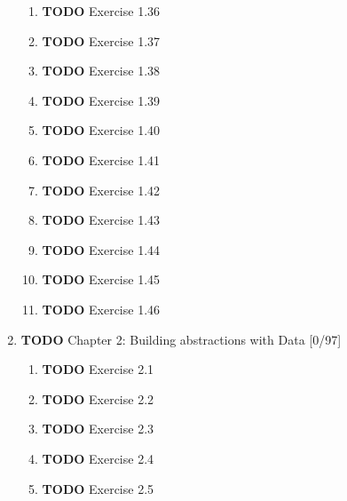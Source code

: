 \documentclass[11pt]{article}
\begin{document}
\begin{enumerate}
\begin{enumerate}
\item {\bfseries\sffamily TODO} Exercise 1.36
\label{sec:org29e807e}

\item {\bfseries\sffamily TODO} Exercise 1.37
\label{sec:org7d01ac9}

\item {\bfseries\sffamily TODO} Exercise 1.38
\label{sec:org8d2c3f0}

\item {\bfseries\sffamily TODO} Exercise 1.39
\label{sec:orgeb3da39}

\item {\bfseries\sffamily TODO} Exercise 1.40
\label{sec:orgfdf52ee}

\item {\bfseries\sffamily TODO} Exercise 1.41
\label{sec:orgf09fc71}

\item {\bfseries\sffamily TODO} Exercise 1.42
\label{sec:org933c5c0}

\item {\bfseries\sffamily TODO} Exercise 1.43
\label{sec:orgc535d80}

\item {\bfseries\sffamily TODO} Exercise 1.44
\label{sec:orgb756f3b}

\item {\bfseries\sffamily TODO} Exercise 1.45
\label{sec:orgbf90634}

\item {\bfseries\sffamily TODO} Exercise 1.46
\label{sec:org3394531}
\end{enumerate}


\item {\bfseries\sffamily TODO} Chapter 2: Building abstractions with Data [0/97]
\label{sec:org2432029}

\begin{enumerate}
\item {\bfseries\sffamily TODO} Exercise 2.1
\label{sec:org632b941}

\item {\bfseries\sffamily TODO} Exercise 2.2
\label{sec:orgd1949e5}

\item {\bfseries\sffamily TODO} Exercise 2.3
\label{sec:org56ac87c}

\item {\bfseries\sffamily TODO} Exercise 2.4
\label{sec:org153041f}

\item {\bfseries\sffamily TODO} Exercise 2.5
\label{sec:org4bff1f3}


\end{enumerate}
\end{enumerate}
\end{document}
